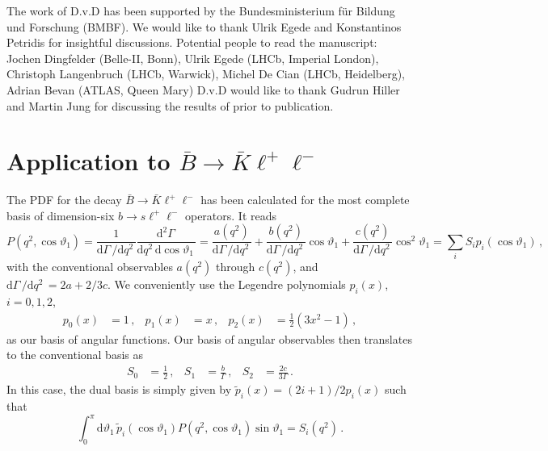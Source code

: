 \documentclass[aps,prd,reprint,nofootinbib,preprintnumbers]{revtex4}
\newcommand{\dual}[1]{\tilde{#1}}
\newcommand{\rmdx}[1]{\mbox{d} #1 \,} %
\renewcommand{\theta}{\vartheta}
\newcommand{\danny}[1]{{\color{purple}#1}}
\begin{document}
\acknowledgments

The work of D.v.D has been supported by the Bundesministerium f\"ur Bildung und Forschung (BMBF).
We would like to thank Ulrik Egede and Konstantinos Petridis for insightful discussions.
\danny{Potential people to read the manuscript: Jochen Dingfelder (Belle-II, Bonn), Ulrik Egede (LHCb, Imperial London), Christoph Langenbruch (LHCb, Warwick), Michel De Cian (LHCb, Heidelberg), Adrian Bevan (ATLAS, Queen Mary)  }
D.v.D would like to thank Gudrun Hiller and Martin Jung for discussing the results of \cite{Das:2014sra} prior to publication.

\appendix

\section{Application to $\bar{B}\to\bar{K}\ell^+\ell^-$}
\label{app:btokll}

The PDF for the decay $\bar{B}\to\bar{K}\ell^+\ell^-$ has been calculated for the most
complete basis of dimension-six $b\to s \ell^+\ell^-$ operators. It reads \cite{Bobeth:2007dw,Bobeth:2012vn}
\begin{equation}
    P(q^2, \cos\theta_1)
        = \frac{1}{\rmdx{\Gamma}/\rmdx{q^2}} \frac{\rmdx{^2\Gamma}}{\rmdx{q^2} \rmdx{\cos\theta_1}}
        = \frac{a(q^2)}{\rmdx{\Gamma}/\rmdx{q^2}} + \frac{b(q^2)}{\rmdx{\Gamma}/\rmdx{q^2}} \cos\theta_1 + \frac{c(q^2)}{\rmdx{\Gamma}/\rmdx{q^2}} \cos^2\theta_1
        = \sum_i S_i p_i(\cos\theta_1)\,,
\end{equation}
with the conventional observables $a(q^2)$ through $c(q^2)$, and $\rmdx{\Gamma}/\rmdx{q^2} = 2a + 2/3 c$. We conveniently use the Legendre polynomials
$p_i(x)$, $i=0,1,2$,
\begin{equation}
\begin{aligned}
    p_0(x) & = 1\,, &
    p_1(x) & = x\,, &
    p_2(x) & = \frac{1}{2} (3x^2 - 1)\,,
\end{aligned}
\end{equation}
as our basis of angular functions. Our basis of angular observables then
translates to the conventional basis as
\begin{equation}
\begin{aligned}
    S_0 & = \frac{1}{2}\,, &
    S_1 & = \frac{b}{\Gamma}\,, &
    S_2 & = \frac{2c}{3\Gamma}\,.
\end{aligned}
\end{equation}
In this case, the dual basis is simply given by $\tilde{p}_i(x) = (2 i + 1)/2 p_i(x)$
such that
\begin{equation}
    \int_0^\pi \rmdx{\theta_1} \dual{p}_i(\cos\theta_1) P(q^2, \cos\theta_1)\sin\theta_1 = S_i(q^2)\,.
\end{equation}
\end{document}
